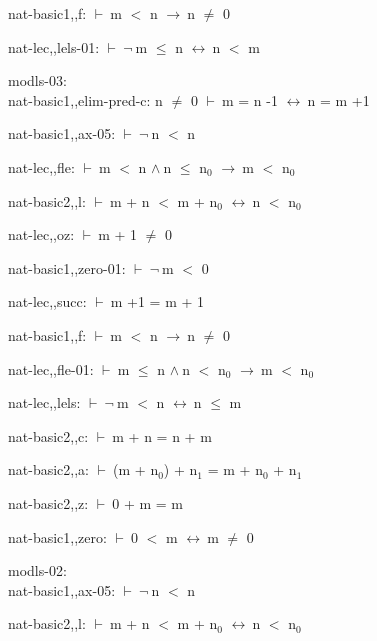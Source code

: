 \documentclass[a4paper]{article}
\newcommand{\Fol}{\mbox{$\vdash\ $}}
\newcommand{\Not}{\mbox{$\neg\ $}}
\newcommand{\And}{\mbox{$\wedge\ $}}
\newcommand{\Imp}{\mbox{$\rightarrow\ $}}
\newcommand{\Equiv}{\mbox{$\leftrightarrow\ $}}
\begin{document}
nat-basic1,,f: 
 \Fol m $<$ n \Imp n $\neq$ 0



nat-lec,,lels-01: 
 \Fol \Not m $\le$ n \Equiv n $<$ m



\bigskip

modls-03:\\ nat-basic1,,elim-pred-c: 
n $\neq$ 0
 \Fol m = n -1 \Equiv n = m +1



nat-basic1,,ax-05: 
 \Fol \Not n $<$ n



nat-lec,,fle: 
 \Fol m $<$ n \And n $\le$ $\mbox{n}_{0}$ \Imp m $<$ $\mbox{n}_{0}$



nat-basic2,,l: 
 \Fol m + n $<$ m + $\mbox{n}_{0}$ \Equiv n $<$ $\mbox{n}_{0}$



nat-lec,,oz: 
 \Fol m + 1 $\neq$ 0



nat-basic1,,zero-01: 
 \Fol \Not m $<$ 0



nat-lec,,succ: 
 \Fol m +1 = m + 1



nat-basic1,,f: 
 \Fol m $<$ n \Imp n $\neq$ 0



nat-lec,,fle-01: 
 \Fol m $\le$ n \And n $<$ $\mbox{n}_{0}$ \Imp m $<$ $\mbox{n}_{0}$



nat-lec,,lels: 
 \Fol \Not m $<$ n \Equiv n $\le$ m



nat-basic2,,c: 
 \Fol m + n = n + m



nat-basic2,,a: 
 \Fol (m + $\mbox{n}_{0}$) + $\mbox{n}_{1}$ = m + $\mbox{n}_{0}$ + $\mbox{n}_{1}$



nat-basic2,,z: 
 \Fol 0 + m = m



nat-basic1,,zero: 
 \Fol 0 $<$ m \Equiv m $\neq$ 0



\bigskip

modls-02:\\ nat-basic1,,ax-05: 
 \Fol \Not n $<$ n



nat-basic2,,l: 
 \Fol m + n $<$ m + $\mbox{n}_{0}$ \Equiv n $<$ $\mbox{n}_{0}$
\end{document}
